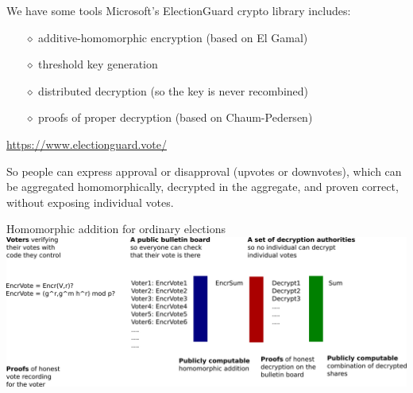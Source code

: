 \documentclass[10pt,xcolor=svgnames,169]{beamer} %
\begin{document}
	\begin{frame}[fragile]{We have some tools} %
		Microsoft's ElectionGuard crypto library includes: %
		\begin{itemize} %
			\item[$\diamond$] additive-homomorphic encryption (based on El Gamal)
			\item[$\diamond$] threshold key generation
			\item[$\diamond$] distributed decryption (so the key is never recombined)
			\item[$\diamond$] proofs of proper decryption (based on Chaum-Pedersen)
		\end{itemize}
	
		\url{https://www.electionguard.vote/}

	So people can express approval or disapproval (upvotes or downvotes), which can be aggregated homomorphically, decrypted in the aggregate, and proven correct, without exposing individual votes.
		
	\end{frame}
	
		\begin{frame}[fragile]{Homomorphic addition for ordinary elections}
	\includegraphics[scale=0.17]{e2e-vVoting-homomorphicAddition.png}
\end{frame}

%	
\end{document}
